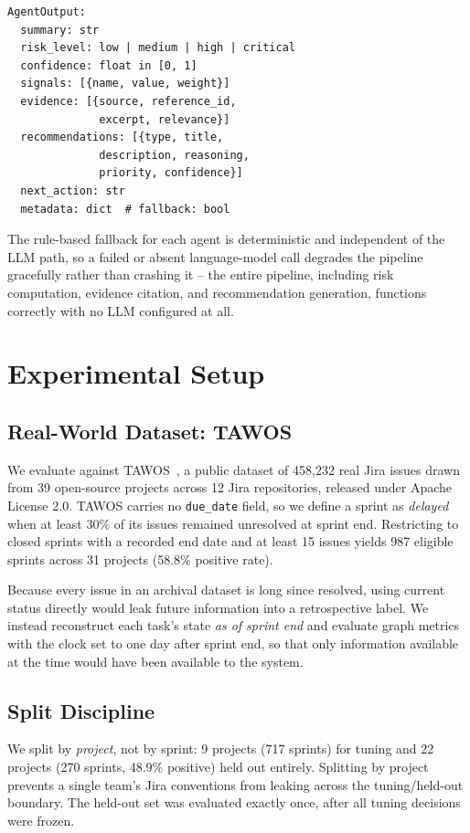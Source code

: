 \documentclass[conference]{IEEEtran}
\begin{document}
\begin{lstlisting}
AgentOutput:
  summary: str
  risk_level: low | medium | high | critical
  confidence: float in [0, 1]
  signals: [{name, value, weight}]
  evidence: [{source, reference_id,
              excerpt, relevance}]
  recommendations: [{type, title,
              description, reasoning,
              priority, confidence}]
  next_action: str
  metadata: dict  # fallback: bool
\end{lstlisting}

The rule-based fallback for each agent is deterministic and independent of the LLM
path, so a failed or absent language-model call degrades the pipeline gracefully
rather than crashing it -- the entire pipeline, including risk computation, evidence
citation, and recommendation generation, functions correctly with no LLM configured
at all.

\section{Experimental Setup}

\subsection{Real-World Dataset: TAWOS}

We evaluate against TAWOS~\cite{tawos}, a public dataset of 458{,}232 real Jira
issues drawn from 39 open-source projects across 12 Jira repositories, released
under Apache License 2.0. TAWOS carries no \texttt{due\_date} field, so we define a
sprint as \emph{delayed} when at least 30\% of its issues remained unresolved at
sprint end. Restricting to closed sprints with a recorded end date and at least 15
issues yields 987 eligible sprints across 31 projects (58.8\% positive rate).

Because every issue in an archival dataset is long since resolved, using current
status directly would leak future information into a retrospective label. We instead
reconstruct each task's state \emph{as of sprint end} and evaluate graph metrics with
the clock set to one day after sprint end, so that only information available at the
time would have been available to the system.

\subsection{Split Discipline}

We split by \emph{project}, not by sprint: 9 projects (717 sprints) for tuning and
22 projects (270 sprints, 48.9\% positive) held out entirely. Splitting by project
prevents a single team's Jira conventions from leaking across the tuning/held-out
boundary. The held-out set was evaluated exactly once, after all tuning decisions
were frozen.
\end{document}

